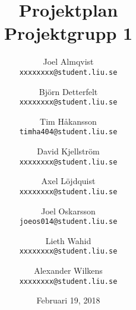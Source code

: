 \title{Projektplan\\
    \large Projektgrupp 1}

\author{
    Joel Almqvist\\
    \texttt{xxxxxxxx@student.liu.se}
    \and
    Björn Detterfelt\\
    \texttt{xxxxxxxx@student.liu.se}
    \and
    Tim Håkansson\\
    \texttt{timha404@student.liu.se}
    \and
    David Kjellström\\
    \texttt{xxxxxxxx@student.liu.se}
    \and
    Axel Löjdquist\\
    \texttt{xxxxxxxx@student.liu.se}
    \and
    Joel Oskarsson\\
    \texttt{joeos014@student.liu.se}
    \and
    Lieth Wahid\\
    \texttt{xxxxxxxx@student.liu.se}
    \and
    Alexander Wilkens\\
    \texttt{xxxxxxxx@student.liu.se}
}

\date{Februari 19, 2018}

\maketitle
\pagebreak
